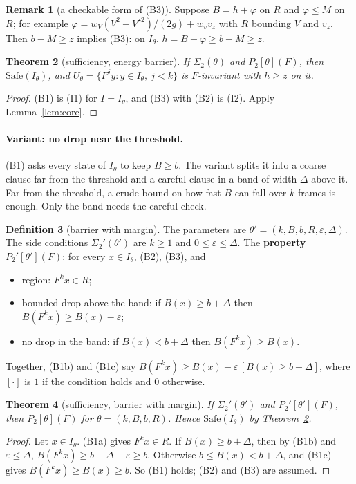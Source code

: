 \documentclass[11pt]{article}
\newtheorem{theorem}{Theorem}
\theoremstyle{definition}
\newtheorem{definition}[theorem]{Definition}
\newtheorem{remark}[theorem]{Remark}
\begin{document}
\begin{remark}[a checkable form of (B3)]\label{rem:b3}
Suppose $B = h + \varphi$ on $R$ and $\varphi \le M$ on $R$; for example $\varphi = w_V (V^2 - V^{\star 2})/(2g) + w_v v_z$ with $R$ bounding $V$ and $v_z$. Then $b - M \ge z$ implies (B3): on $I_\theta$, $h = B - \varphi \ge b - M \ge z$.
\end{remark}

\begin{theorem}[sufficiency, energy barrier]\label{thm:barrier}
If $\Sigma_2(\theta)$ and $P_2[\theta](F)$, then $\mathrm{Safe}(I_\theta)$, and $U_\theta = \{F^j y : y \in I_\theta,\ j < k\}$ is $F$-invariant with $h \ge z$ on it.
\end{theorem}
\begin{proof}
(B1) is (I1) for $I = I_\theta$, and (B3) with (B2) is (I2). Apply Lemma~\ref{lem:core}.
\end{proof}

\paragraph{Variant: no drop near the threshold.} (B1) asks every state of $I_\theta$ to keep $B \ge b$. The variant splits it into a coarse clause far from the threshold and a careful clause in a band of width $\Delta$ above it. Far from the threshold, a crude bound on how fast $B$ can fall over $k$ frames is enough. Only the band needs the careful check.

\begin{definition}[barrier with margin]\label{def:near}
The parameters are $\theta' = (k, B, b, R, \varepsilon, \Delta)$. The side conditions $\Sigma_2'(\theta')$ are $k \ge 1$ and $0 \le \varepsilon \le \Delta$. The \textbf{property} $P_2'[\theta'](F)$: for every $x \in I_\theta$, (B2), (B3), and
\begin{itemize}
\item[(B1a)] region: $F^k x \in R$;
\item[(B1b)] bounded drop above the band: if $B(x) \ge b + \Delta$ then $B(F^k x) \ge B(x) - \varepsilon$;
\item[(B1c)] no drop in the band: if $B(x) < b + \Delta$ then $B(F^k x) \ge B(x)$.
\end{itemize}
Together, (B1b) and (B1c) say $B(F^k x) \ge B(x) - \varepsilon\,[B(x) \ge b + \Delta]$, where $[\cdot]$ is $1$ if the condition holds and $0$ otherwise.
\end{definition}

\begin{theorem}[sufficiency, barrier with margin]\label{thm:near}
If $\Sigma_2'(\theta')$ and $P_2'[\theta'](F)$, then $P_2[\theta](F)$ for $\theta = (k, B, b, R)$. Hence $\mathrm{Safe}(I_\theta)$ by Theorem~\ref{thm:barrier}.
\end{theorem}
\begin{proof}
Let $x \in I_\theta$. (B1a) gives $F^k x \in R$. If $B(x) \ge b + \Delta$, then by (B1b) and $\varepsilon \le \Delta$, $B(F^k x) \ge b + \Delta - \varepsilon \ge b$. Otherwise $b \le B(x) < b + \Delta$, and (B1c) gives $B(F^k x) \ge B(x) \ge b$. So (B1) holds; (B2) and (B3) are assumed.
\end{proof}
\end{document}
